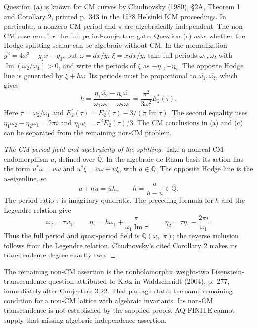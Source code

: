 \documentclass[11pt,a4paper]{article}
\theoremstyle{definition}\newtheorem{definition}[theorem]{Definition}
\theoremstyle{remark}\newtheorem{remark}[theorem]{Remark}
\begin{document}
Question (a) is known for CM curves by Chudnovsky (1980),
\S2A, Theorem 1 and Corollary 2, printed p.~343
in the 1978 Helsinki ICM proceedings. In particular,
a nonzero CM period and $\pi$ are algebraically
independent. The non-CM case remains the full
period-conjecture gate. Question (c) asks whether the
Hodge-splitting scalar can be algebraic without CM.
In the normalization $y^2=4x^3-g_2x-g_3$,
put $\omega=dx/y$, $\xi=x\,dx/y$, take full periods
$\omega_1,\omega_2$ with $\operatorname{Im}
(\omega_2/\omega_1)>0$, and write the periods of
$\xi$ as $-\eta_1,-\eta_2$. The opposite Hodge line
is generated by $\xi+h\omega$. Its periods must be
proportional to $\overline{\omega_1},
\overline{\omega_2}$, which gives
\[
 h=\frac{\eta_1\overline{\omega_2}-\eta_2\overline{\omega_1}}
          {\omega_1\overline{\omega_2}-\omega_2\overline{\omega_1}}
   =\frac{\pi^2}{3\omega_1^2}E_2^*(\tau).
\]
Here $\tau=\omega_2/\omega_1$ and
$E_2^*(\tau)=E_2(\tau)-3/(\pi\operatorname{Im}\tau)$.
The second equality uses
$\eta_1\omega_2-\eta_2\omega_1=2\pi i$ and
$\eta_1\omega_1=\pi^2E_2(\tau)/3$.
The CM conclusions in (a) and (c) can be separated
from the remaining non-CM problem.
\begin{proof}[The CM period field and algebraicity of the splitting]
Take a nonreal CM endomorphism $u$, defined over
$\overline{\mathbb Q}$. In the algebraic de Rham
basis its action has the form
$u^*\omega=u\omega$ and
$u^*\xi=a\omega+\overline u\xi$, with
$a\in\overline{\mathbb Q}$. The opposite Hodge line
is the $\overline u$-eigenline, so
\[
 a+hu=\overline u h,\qquad
 h=\frac{a}{\overline u-u}\in\overline{\mathbb Q}.
\]
The period ratio $\tau$ is imaginary quadratic.
The preceding formula for $h$ and the Legendre
relation give
\[
 \omega_2=\tau\omega_1,\qquad
 \eta_1=h\omega_1+\frac{\pi}{\omega_1\operatorname{Im}\tau},
 \qquad \eta_2=\tau\eta_1-\frac{2\pi i}{\omega_1}.
\]
Thus the full period and quasi-period field is
$\overline{\mathbb Q}(\omega_1,\pi)$; the reverse
inclusion follows from the Legendre relation.
Chudnovsky's cited Corollary 2 makes its
transcendence degree exactly two.
\end{proof}
The remaining non-CM assertion is the nonholomorphic weight-two
Eisenstein-transcendence question attributed to Katz
in Waldschmidt (2004), p.~277, immediately after
Conjecture 3.22. That passage states the same remaining
condition for a non-CM lattice with algebraic invariants.
Its non-CM transcendence is not established by the
supplied proofs. AQ-FINITE cannot supply that missing
algebraic-independence assertion.
\end{document}
